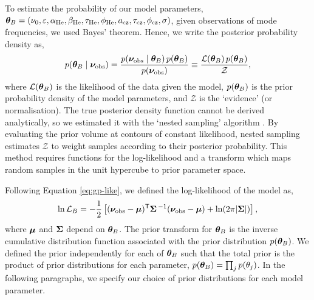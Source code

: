 To estimate the probability of our model parameters, \(\bm{\theta}_B = (\nu_0, \varepsilon, \alpha_{{\mathrm{He}}}, \beta_{{\mathrm{He}}}, \tau_{{\mathrm{He}}}, \phi_{{\mathrm{He}}}, a_{{\mathrm{cz}}}, \tau_{{\mathrm{cz}}}, \phi_{{\mathrm{cz}}}, \sigma)\), given observations of mode frequencies, we used Bayes' theorem. Hence, we write the posterior probability density as,
%
\begin{equation}
    p(\bm{\theta}_B \mid \bm{\nu}_{{\mathrm{obs}}}) = \frac{p(\bm{\nu}_{{\mathrm{obs}}} \mid \bm{\theta}_B)\,p(\bm{\theta}_B)}{p(\bm{\nu}_{{\mathrm{obs}}})} \equiv \frac{\mathcal{L}(\bm{\theta}_B)\,p(\bm{\theta}_B)}{\mathcal{Z}},
\end{equation}
%
where \(\mathcal{L}(\bm{\theta}_B)\) is the likelihood of the data given the model, \(p(\bm{\theta}_B)\) is the prior probability density of the model parameters, and \(\mathcal{Z}\) is the `evidence' (or normalisation). The true posterior density function cannot be derived analytically, so we estimated it with the `nested sampling' algorithm \citep{Skilling2004}. By evaluating the prior volume at contours of constant likelihood, nested sampling estimates \(\mathcal{Z}\) to weight samples according to their posterior probability. This method requires functions for the log-likelihood and a transform which maps random samples in the unit hypercube to prior parameter space. 

Following Equation \ref{eq:gp-like}, we defined the log-likelihood of the model as,
%
\begin{equation}
    \ln\mathcal{L}_B = - \frac12 \left[ {(\bm{\nu}_{{\mathrm{obs}}} - \bm{\mu})^\mathsf{T} \bm{\Sigma}^{\,-1} (\bm{\nu}_{{\mathrm{obs}}} - \bm{\mu})} + \ln(2 \pi | \bm{\Sigma} | ) \right],
\end{equation}
%
where \(\bm{\mu}\) and \(\bm{\Sigma}\) depend on \(\bm{\theta}_B\). The prior transform for \(\bm{\theta}_B\) is the inverse cumulative distribution function associated with the prior distribution \(p(\bm{\theta}_B)\). We defined the prior independently for each of \(\bm{\theta}_B\) such that the total prior is the product of prior distributions for each parameter, \(p(\bm{\theta}_B) = \prod_j p(\theta_{j})\). In the following paragraphs, we specify our choice of prior distributions for each model parameter.

